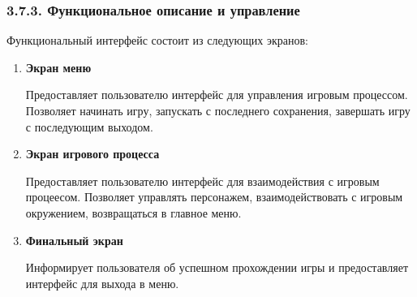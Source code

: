 \subsubsection*{3.7.3. Функциональное описание и управление}
Функциональный интерфейс состоит из следующих экранов:
\begin{enumerate}
  \item \textbf{Экран меню} \par
      Предоставляет пользователю интерфейс для управления игровым процессом. Позволяет начинать игру, запускать с последнего сохранения, завершать игру с последующим выходом.
  \item \textbf{Экран игрового процесса} \par
      Предоставляет пользователю интерфейс для взаимодействия с игровым процеесом. Позволяет управлять персонажем, взаимодействовать с игровым окружением, возвращаться в главное меню.
  \item \textbf{Финальный экран}\par
      Информирует пользователя об успешном прохождении игры и предоставляет интерфейс для выхода в меню.
\end{enumerate}
